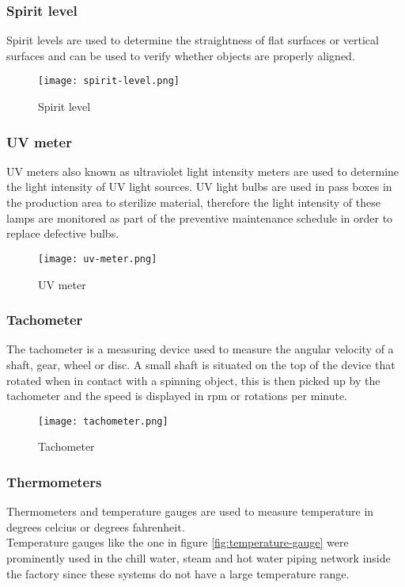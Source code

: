 \documentclass[a4paper,12pt]{article}
\begin{document}
				\subsubsection*{Spirit level}
					Spirit levels are used to determine the straightness of flat surfaces or vertical surfaces and can be used to verify whether objects are properly aligned.
				 
						\begin{figure}[H]
							\centering			
							\texttt{[image: spirit-level.png]}				
							\caption{Spirit level}
							\label{fig:spirit-level}
						\end{figure}				
				
				\newpage
				\subsubsection*{UV meter}
					UV meters also known as ultraviolet light intensity meters are used to determine the light intensity of UV light sources.
					UV light bulbs are used in pass boxes in the production area to sterilize material, therefore the light intensity of these lamps are monitored as part of the preventive maintenance schedule in order to replace defective bulbs. 
						\begin{figure}[H]
							\centering				
							\texttt{[image: uv-meter.png]}
							\caption{UV meter}
							\label{fig:uv-meter}
						\end{figure}				
				
				\subsubsection*{Tachometer}
					The tachometer is a measuring device used to measure the angular velocity of a shaft, gear, wheel or disc.
					A small shaft is situated on the top of the device that rotated when in contact with a spinning object, this is then picked up by the tachometer and the speed is displayed in rpm or rotations per minute. 
						\begin{figure}[H]
							\centering				
							\texttt{[image: tachometer.png]}
							\caption{Tachometer}
							\label{fig:tachometer}
						\end{figure}					
									
				\subsubsection*{Thermometers}	
					Thermometers and temperature gauges are used to measure temperature in degrees celcius or degrees fahrenheit.\\
					Temperature gauges like the one in figure \ref{fig:temperature-gauge} were prominently used in the chill water, steam and hot water piping network inside the factory since these systems do not have a large temperature range.\\
					
\end{document}
